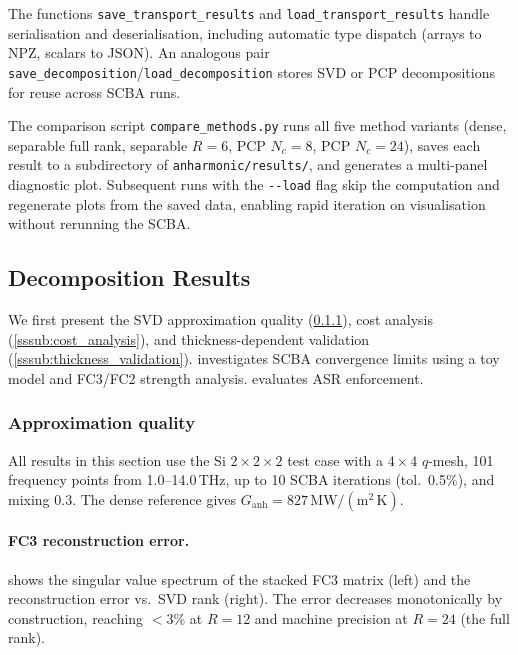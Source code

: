 The functions \texttt{save\_transport\_results} and
\texttt{load\_transport\_results} handle serialisation and
deserialisation, including automatic type dispatch (arrays to NPZ,
scalars to JSON).  An analogous pair
\texttt{save\_decomposition}/\texttt{load\_decomposition} stores SVD or
PCP decompositions for reuse across SCBA runs.

The comparison script \texttt{compare\_methods.py} runs all five method
variants (dense, separable full rank, separable $R=6$, PCP $N_c=8$, PCP
$N_c=24$), saves each result to a subdirectory of
\texttt{anharmonic/results/}, and generates a multi-panel diagnostic
plot.  Subsequent runs with the \texttt{-{}-load} flag skip the
computation and regenerate plots from the saved data, enabling rapid
iteration on visualisation without rerunning the SCBA.

\subsection{Decomposition Results}
\label{sub:decomp_results}

We first present the SVD approximation quality
(\cref{sssub:pcp_quality}), cost analysis (\cref{sssub:cost_analysis}),
and thickness-dependent validation (\cref{sssub:thickness_validation}).
 investigates SCBA convergence limits
using a toy model and FC3/FC2 strength analysis.
 evaluates ASR enforcement.


\subsubsection{Approximation quality}
\label{sssub:pcp_quality}

All results in this section use the Si $2\times 2\times 2$ test case
with a $4\times 4$ $q$-mesh, 101 frequency points from
1.0--14.0\,THz, up to 10 SCBA iterations (tol.\ 0.5\%), and mixing
0.3.  The dense reference gives
$G_\mathrm{anh} = 827\,\mathrm{MW/(m^2\,K)}$.

\paragraph{FC3 reconstruction error.}
 shows the singular value spectrum of the
stacked FC3 matrix (left) and the reconstruction error vs.\ SVD
rank (right).  The error decreases monotonically by construction,
reaching $< 3\%$ at $R = 12$ and machine precision at $R = 24$
(the full rank).

